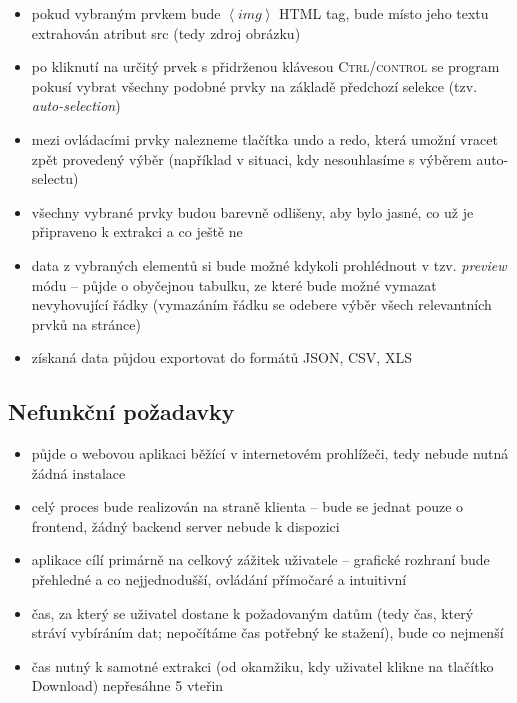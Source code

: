 \documentclass[thesis=B,czech]{FITthesis}[2012/06/26]
\begin{document}
\begin{itemize}
\begin{itemize}
	\end{itemize}
	\item pokud vybraným prvkem bude $\left<img\right>$ HTML tag, bude místo jeho textu extrahován atribut \textsf{src} (tedy zdroj obrázku)
	\item po kliknutí na určitý prvek s přidrženou klávesou \textsc{Ctrl/control} se program pokusí vybrat všechny podobné prvky na základě předchozí selekce (tzv. \emph{auto-selection})
	\item mezi ovládacími prvky nalezneme tlačítka \textsf{undo} a \textsf{redo}, která umožní vracet zpět provedený výběr (například v situaci, kdy nesouhlasíme s výběrem auto-selectu)
	\item všechny vybrané prvky budou barevně odlišeny, aby bylo jasné, co už je připraveno k extrakci a co ještě ne
	\item data z vybraných elementů si bude možné kdykoli prohlédnout v tzv. \textit{preview} módu -- půjde o obyčejnou tabulku, ze které bude možné vymazat nevyhovující řádky (vymazáním řádku se odebere výběr všech relevantních prvků na stránce)
	\item získaná data půjdou exportovat do formátů JSON, CSV, XLS
\end{itemize}

\subsection{Nefunkční požadavky}
\begin{itemize}
	\item půjde o webovou aplikaci běžící v internetovém prohlížeči, tedy nebude nutná žádná instalace
	\item celý proces bude realizován na straně klienta -- bude se jednat pouze o frontend, žádný backend server nebude k dispozici
	\item aplikace cílí primárně na celkový zážitek uživatele -- grafické rozhraní bude přehledné a co nejjednodušší, ovládání přímočaré a intuitivní
	\item čas, za který se uživatel dostane k požadovaným datům (tedy čas, který stráví vybíráním dat; nepočítáme čas potřebný ke stažení), bude co nejmenší
	\item čas nutný k samotné extrakci (od okamžiku, kdy uživatel klikne na tlačítko \textsf{Download}) nepřesáhne 5 vteřin
\end{itemize}
\end{document}
